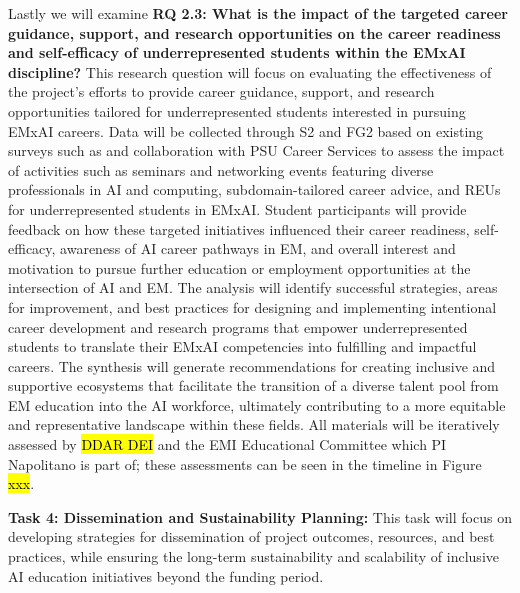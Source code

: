 \documentclass[11pt]{article}
\begin{document}
Lastly we will examine \textbf{RQ 2.3: What is the impact of the targeted career guidance, support, and research opportunities on the career readiness and self-efficacy of underrepresented students within the EMxAI discipline?} 
This research question will focus on evaluating the effectiveness of the project's efforts to provide career guidance, support, and research opportunities tailored for underrepresented students interested in pursuing EMxAI careers. 
Data will be collected through S2 and FG2 based on existing surveys such as \cite{desing2024identifying} and collaboration with PSU Career Services to assess the impact of activities such as seminars and networking events featuring diverse professionals in AI and computing, subdomain-tailored career advice, and REUs for underrepresented students in EMxAI. 
Student participants will provide feedback on how these targeted initiatives influenced their career readiness, self-efficacy, awareness of AI career pathways in EM, and overall interest and motivation to pursue further education or employment opportunities at the intersection of AI and EM. 
The analysis will identify successful strategies, areas for improvement, and best practices for designing and implementing intentional career development and research programs that empower underrepresented students to translate their EMxAI competencies into fulfilling and impactful careers. 
The synthesis will generate recommendations for creating inclusive and supportive ecosystems that facilitate the transition of a diverse talent pool from EM education into the AI workforce, ultimately contributing to a more equitable and representative landscape within these fields. All materials will be iteratively assessed by \hl{DDAR DEI} and the EMI Educational Committee which PI Napolitano is part of; these assessments can be seen in the timeline in Figure \hl{xxx}.

\begin{tcolorbox}[colback=mycmykcolor, colframe=black, boxrule=1pt, coltext=black]
\textbf{Task 4: Dissemination and Sustainability Planning:} This task will focus on developing strategies for dissemination of project outcomes, resources, and best practices, while ensuring the long-term sustainability and scalability of inclusive AI education initiatives beyond the funding period.
\end{tcolorbox}
\end{document}
